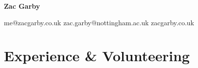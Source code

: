 \documentclass[12pt]{article}
\newcommand{\sqsep}{\quad {\tiny $\blacksquare$} \quad}
\begin{document}
\begin{center}
	{\HUGE \textbf{Zac Garby}}
	
	me@zacgarby.co.uk \sqsep
	zac.garby@nottingham.ac.uk \sqsep
	zacgarby.co.uk
\end{center}


\section*{Experience \& Volunteering}
\end{document}
